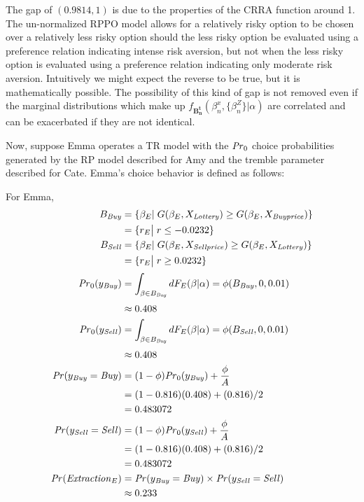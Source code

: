 \documentclass[../main.tex]{subfiles}
\begin{document}
The gap of $(0.9814,1)$ is due to the properties of the CRRA function around 1.
The un-normalized RPPO model allows for a relatively risky option to be chosen over a relatively less risky option should the less risky option be evaluated using a preference relation indicating intense risk aversion, but not when the less risky option is evaluated using a preference relation indicating only moderate risk aversion.
Intuitively we might expect the reverse to be true, but it is mathematically possible.
The possibility of this kind of gap is not removed even if the marginal distributions which make up $f_{\mathbf{B^t_n}}(\beta_n^x,\{\beta_n^Z\}|\alpha)$ are correlated and can be exacerbated if they are not identical.

Now, suppose Emma operates a TR model with the ${\mathit{Pr}}_0$ choice probabilities generated by the RP model described for Amy and the tremble parameter described for Cate.
Emma's choice behavior is defined as follows:

\noindent For Emma,
\begin{align}
	\label{eq2:Emma}
	\begin{split}
		B_{\mathit{Buy}} &= \{ \beta_E |\; G(\beta_E,X_{\mathit{Lottery}}) \geq G(\beta_E,X_{\mathit{Buy price}})\}\\
		&= \{ r_E \big|\; r \leq -0.0232 \} \\
		B_{\mathit{Sell}} &= \{ \beta_E |\; G(\beta_E,X_{\mathit{Sell price}}) \geq G(\beta_E,X_{\mathit{Lottery}})\}\\
		&= \{ r_E \big|\; r \geq 0.0232 \} \\[0.5ex]
		{\ensuremath{\mathit{Pr}}}_0(y_{\mathit{Buy}}) &= \int_{\beta \in B_{\mathit{Buy}}} dF_E(\beta|\alpha) = \phi(B_{\mathit{Buy}},0,0.01)\\[0.5ex]
		&\approx 0.408 \\
		{\mathit{Pr}}_0(y_{\mathit{Sell}}) &= \int_{\beta \in B_{\mathit{Buy}}} dF_E(\beta|\alpha) = \phi(B_{\mathit{Sell}},0,0.01)\\[0.5ex]
		&\approx 0.408 \\
		{\mathit{Pr}}(y_{\mathit{Buy}}=\mathit{Buy}) &= (1-\phi) {\mathit{Pr}}_0(y_{\mathit{Buy}}) + \frac{\phi}{A}\\
		&=(1-0.816)(0.408) + (0.816)/2\\
		&= 0.483072\\
		{\mathit{Pr}}(y_{\mathit{Sell}}=\mathit{Sell}) &= (1-\phi) {\mathit{Pr}}_0(y_{\mathit{Sell}}) + \frac{\phi}{A}\\
		&=(1-0.816)(0.408) + (0.816)/2\\
		&= 0.483072\\
		{\mathit{Pr}}(\mathit{Extraction}_E) &= {\mathit{Pr}}(y_{\mathit{Buy}} = \mathit{Buy}) \times {\ensuremath{\mathit{Pr}}}(y_{\mathit{Sell}} = \mathit{Sell})\\
		&\approx 0.233
	\end{split}
\end{align}
\end{document}
